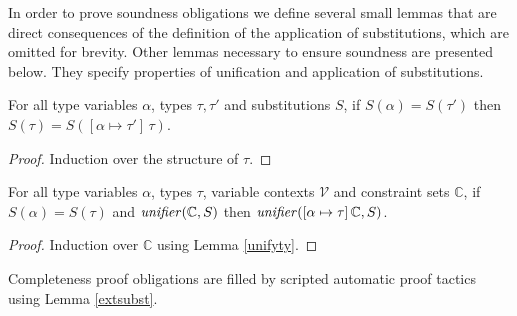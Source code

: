 In order to prove soundness obligations we define several small lemmas
that are direct consequences of the definition of the application of
substitutions, which are omitted for brevity. Other lemmas necessary
to ensure soundness are presented below. They specify properties of
unification and application of substitutions.

\begin{Lemma}\label{unifyty}
For all type variables $\alpha$, types $\tau,\tau'$ and substitutions
$S$, if $S(\alpha) = S(\tau')$ then $S(\tau) = S([\alpha \mapsto
  \tau']\,\tau)$.
\end{Lemma}
\begin{proof}
Induction over the structure of $\tau$.
\end{proof}

\begin{Lemma}
For all type variables $\alpha$, types $\tau$, variable contexts
$\mathcal{V}$ and constraint sets $\mathbb{C}$, if $S(\alpha) = S(\tau)$
and $\text{\it unifier\/}(\mathbb{C},S)$ then
$\text{\it unifier\/}([\alpha\mapsto\tau]\,\mathbb{C},S)$.
\end{Lemma}
\begin{proof}
Induction over $\mathbb{C}$ using Lemma \ref{unifyty}.
\end{proof}

Completeness proof obligations are filled by scripted automatic proof tactics
using Lemma \ref{extsubst}.

%
